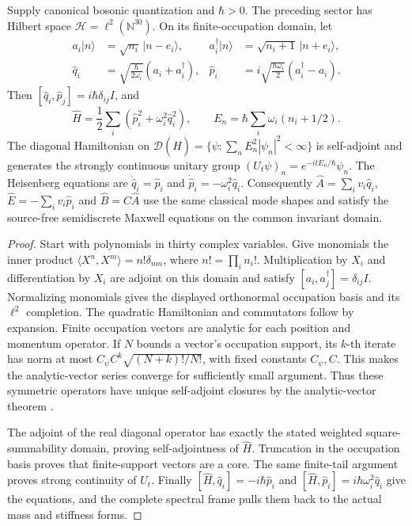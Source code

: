 \begin{theorem}
\label{thm:whitney-fock-bridge}
Supply canonical bosonic quantization and \(\hbar>0\). The preceding
sector has Hilbert space \(\mathcal H=\ell^2(\mathbb N^{30})\).
On its finite-occupation domain, let
\begin{align*}
 a_i|n\rangle&=\sqrt{n_i}\,|n-e_i\rangle,&
 a_i^\dagger|n\rangle&=\sqrt{n_i+1}\,|n+e_i\rangle,\\
 \widehat q_i&=\sqrt{\frac{\hbar}{2\omega_i}}(a_i+a_i^\dagger),&
 \widehat p_i&=i\sqrt{\frac{\hbar\omega_i}{2}}(a_i^\dagger-a_i).
\end{align*}
Then \([\widehat q_i,\widehat p_j]=i\hbar\delta_{ij}I\), and
\[
 \widehat H=\frac12\sum_i(\widehat p_i^2+\omega_i^2\widehat q_i^2),
 \qquad E_n=\hbar\sum_i\omega_i(n_i+1/2).
\]
The diagonal Hamiltonian on
\(\mathcal D(\widehat H)=\{\psi:\sum_n E_n^2|\psi_n|^2<\infty\}\)
is self-adjoint and generates the strongly continuous unitary group
\((U_t\psi)_n=e^{-itE_n/\hbar}\psi_n\).
The Heisenberg equations are
\(\dot{\widehat q}_i=\widehat p_i\) and
\(\dot{\widehat p}_i=-\omega_i^2\widehat q_i\).
Consequently \(\widehat A=\sum_i v_i\widehat q_i\),
\(\widehat E=-\sum_i v_i\widehat p_i\) and
\(\widehat B=C\widehat A\) use the same classical mode shapes and
satisfy the source-free semidiscrete Maxwell equations on the common
invariant domain.
\end{theorem}

\begin{proof}
Start with polynomials in thirty complex variables. Give monomials the
inner product \(\langle X^n,X^m\rangle=n!\delta_{nm}\),
where \(n!=\prod_i n_i!\). Multiplication by \(X_i\) and
differentiation by \(X_i\) are adjoint on this domain and satisfy
\([a_i,a_j^\dagger]=\delta_{ij}I\). Normalizing monomials gives the
displayed orthonormal occupation basis and its \(\ell^2\) completion.
The quadratic Hamiltonian and commutators follow by expansion. Finite
occupation vectors are analytic for each position and momentum operator.
If \(N\) bounds a vector's occupation support, its \(k\)-th iterate
has norm at most \(C_\psi C^k\sqrt{(N+k)!/N!}\), with fixed
constants \(C_\psi,C\). This makes the analytic-vector series converge
for sufficiently small argument. Thus these symmetric operators have
unique self-adjoint closures by the analytic-vector theorem
\cite{Nelson1959}.

The adjoint of the real diagonal operator has exactly the stated weighted
square-summability domain, proving self-adjointness of \(\widehat H\).
Truncation in the occupation basis proves that finite-support vectors are
a core. The same finite-tail argument proves strong continuity of
\(U_t\). Finally
\([\widehat H,\widehat q_i]=-i\hbar\widehat p_i\) and
\([\widehat H,\widehat p_i]=i\hbar\omega_i^2\widehat q_i\)
give the equations, and the complete spectral frame pulls them back to
the actual mass and stiffness forms.
\end{proof}

